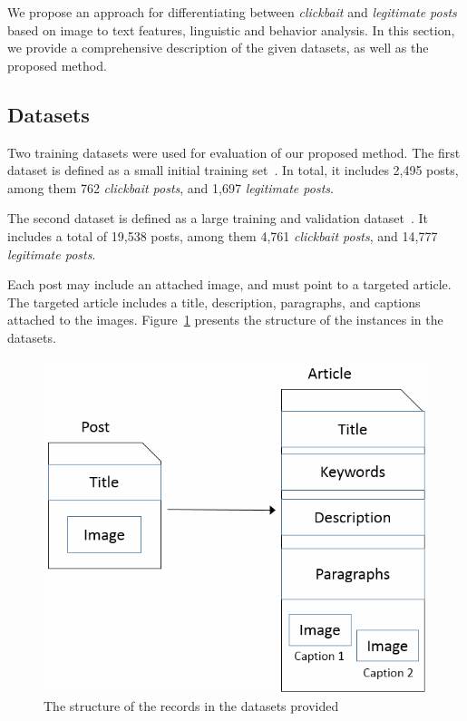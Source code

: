 \documentclass{sig-alternate}
\begin{document}
We propose an approach for differentiating between \emph{clickbait} and \emph{legitimate posts} based on image to text features, linguistic and behavior analysis.   
In this section, we provide a comprehensive description of the given datasets, as well as the proposed method. 

\subsection{Datasets}
\label{sec:datasets}

Two training datasets were used for evaluation of our proposed method.
The first dataset is defined as a small initial training set~\cite{potthast:2016}. 
In total, it includes 2,495 posts, among them 762 \emph{clickbait posts}, and 1,697 \emph{legitimate posts}.  

The second dataset is defined as a large training and validation dataset~\cite{potthast:2017b}.
It includes a total of 19,538 posts, among them 4,761 \emph{clickbait posts}, and 14,777 \emph{legitimate posts}.

Each post may include an attached image, and must point to a targeted article.
The targeted article includes a title, description, paragraphs, and captions attached to the images.
Figure~\ref{fig:problem_structure} presents the structure of the instances in the datasets.

\begin{figure}[htb]
	\centering
	\includegraphics[width=1\linewidth]{structure_demonstration2}
	\caption{The structure of the records in the datasets provided}
	\label{fig:problem_structure}	
\end{figure}
\end{document}

